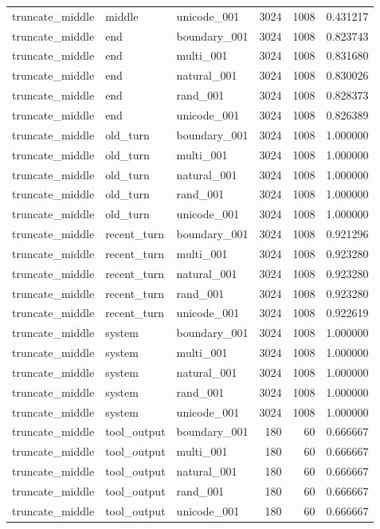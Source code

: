 \begin{tabular}{lllrrr}
truncate_middle & middle & unicode_001 & 3024 & 1008 & 0.431217 \\
truncate_middle & end & boundary_001 & 3024 & 1008 & 0.823743 \\
truncate_middle & end & multi_001 & 3024 & 1008 & 0.831680 \\
truncate_middle & end & natural_001 & 3024 & 1008 & 0.830026 \\
truncate_middle & end & rand_001 & 3024 & 1008 & 0.828373 \\
truncate_middle & end & unicode_001 & 3024 & 1008 & 0.826389 \\
truncate_middle & old_turn & boundary_001 & 3024 & 1008 & 1.000000 \\
truncate_middle & old_turn & multi_001 & 3024 & 1008 & 1.000000 \\
truncate_middle & old_turn & natural_001 & 3024 & 1008 & 1.000000 \\
truncate_middle & old_turn & rand_001 & 3024 & 1008 & 1.000000 \\
truncate_middle & old_turn & unicode_001 & 3024 & 1008 & 1.000000 \\
truncate_middle & recent_turn & boundary_001 & 3024 & 1008 & 0.921296 \\
truncate_middle & recent_turn & multi_001 & 3024 & 1008 & 0.923280 \\
truncate_middle & recent_turn & natural_001 & 3024 & 1008 & 0.923280 \\
truncate_middle & recent_turn & rand_001 & 3024 & 1008 & 0.923280 \\
truncate_middle & recent_turn & unicode_001 & 3024 & 1008 & 0.922619 \\
truncate_middle & system & boundary_001 & 3024 & 1008 & 1.000000 \\
truncate_middle & system & multi_001 & 3024 & 1008 & 1.000000 \\
truncate_middle & system & natural_001 & 3024 & 1008 & 1.000000 \\
truncate_middle & system & rand_001 & 3024 & 1008 & 1.000000 \\
truncate_middle & system & unicode_001 & 3024 & 1008 & 1.000000 \\
truncate_middle & tool_output & boundary_001 & 180 & 60 & 0.666667 \\
truncate_middle & tool_output & multi_001 & 180 & 60 & 0.666667 \\
truncate_middle & tool_output & natural_001 & 180 & 60 & 0.666667 \\
truncate_middle & tool_output & rand_001 & 180 & 60 & 0.666667 \\
truncate_middle & tool_output & unicode_001 & 180 & 60 & 0.666667 \\
\bottomrule
\end{tabular}
